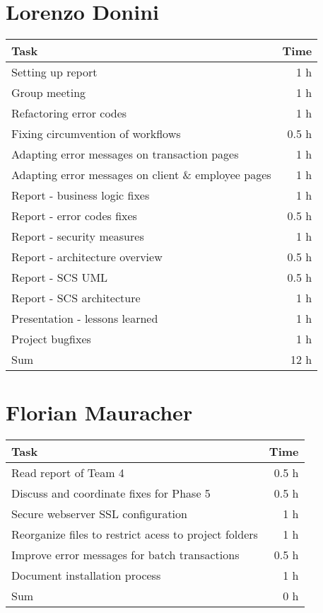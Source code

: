 \section*{Lorenzo Donini}
\begin{table}[h!tpb]
  \centering
  \begin{tabularx}{\textwidth}{X r}
    \toprule
      Task & Time \\
    \midrule
      Setting up report & 1 h \\      
      Group meeting & 1 h \\
      Refactoring error codes & 1 h \\
      Fixing circumvention of workflows & 0.5 h \\
      Adapting error messages on transaction pages & 1 h \\
      Adapting error messages on client \& employee pages & 1 h \\
      Report - business logic fixes & 1 h \\
      Report - error codes fixes & 0.5 h \\      
      Report - security measures & 1 h \\
      Report - architecture overview & 0.5 h \\
      Report - SCS UML & 0.5 h \\
      Report - SCS architecture & 1 h \\
      Presentation - lessons learned & 1 h \\
      Project bugfixes & 1 h \\
    \midrule
      Sum & 12 h \\
    \bottomrule
  \end{tabularx}
\end{table}

\clearpage
\section*{Florian Mauracher}
\begin{table}[h!tpb]
  \centering
  \begin{tabularx}{\textwidth}{X r}
    \toprule
      Task & Time \\
    \midrule
      Read report of Team 4 & 0.5 h \\
      Discuss and coordinate fixes for Phase 5  & 0.5 h \\
      Secure webserver SSL configuration & 1 h \\
      Reorganize files to restrict acess to project folders & 1 h \\
      Improve error messages for batch transactions & 0.5 h \\
      Document installation process & 1 h \\
    \midrule
      Sum & 0 h \\
    \bottomrule
  \end{tabularx}
\end{table}

